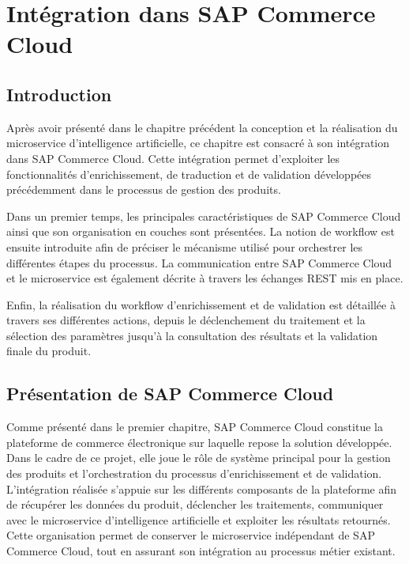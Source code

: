 ﻿\chapter{Intégration dans SAP Commerce Cloud}

\section{Introduction}

Après avoir présenté dans le chapitre précédent la conception et la réalisation du microservice d'intelligence artificielle, ce chapitre est consacré à son intégration dans SAP Commerce Cloud. Cette intégration permet d'exploiter les fonctionnalités d'enrichissement, de traduction et de validation développées précédemment dans le processus de gestion des produits.

Dans un premier temps, les principales caractéristiques de SAP Commerce Cloud ainsi que son organisation en couches sont présentées. La notion de workflow est ensuite introduite afin de préciser le mécanisme utilisé pour orchestrer les différentes étapes du processus. La communication entre SAP Commerce Cloud et le microservice est également décrite à travers les échanges REST mis en place.

Enfin, la réalisation du workflow d'enrichissement et de validation est détaillée à travers ses différentes actions, depuis le déclenchement du traitement et la sélection des paramètres jusqu'à la consultation des résultats et la validation finale du produit.

\section{Présentation de SAP Commerce Cloud}

Comme présenté dans le premier chapitre, SAP Commerce Cloud  constitue la plateforme de commerce électronique sur laquelle repose la solution développée. Dans le cadre de ce projet, elle joue le rôle de système principal pour la gestion des produits et l'orchestration du processus d'enrichissement et de validation.
\newpage
L'intégration réalisée s'appuie sur les différents composants de la plateforme afin de récupérer les données du produit, déclencher les traitements, communiquer avec le microservice d'intelligence artificielle et exploiter les résultats retournés. Cette organisation permet de conserver le microservice indépendant de SAP Commerce Cloud, tout en assurant son intégration au processus métier existant.

